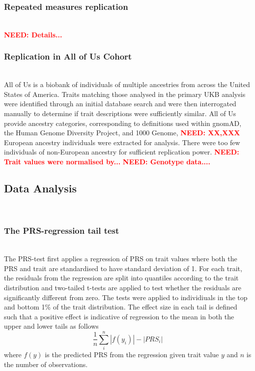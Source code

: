 \documentclass[times]{zHenriquesLab-StyleBioRxiv}
\newcommand\need[1]{\textbf{\textcolor{red}{NEED: #1}}}
\begin{document}
\subsubsection*{Repeated measures replication} ~\\
\need{Details...}

\subsubsection*{Replication in All of Us Cohort} ~\\
All of Us is a biobank of individuals of multiple ancestries from
across the United States of America. Traits matching those analysed in
the primary UKB analysis were identified through an initial database
search and were then interrogated manually to determine if trait
descriptions were sufficiently similar.  All of Us provide ancestry
categories, corresponding to definitions used within gnomAD, the Human
Genome Diversity Project, and 1000 Genome, \need {XX,XXX} European ancestry
individuals were extracted for analysis. There were too few
individuals of non-European ancestry for sufficient replication power.
\need{Trait values were normalised by...} \need{Genotype data....}


\subsection*{Data Analysis} ~\\
\vspace*{-0.5cm} 
\subsubsection*{The PRS-regression tail test}~\\
The PRS-test first applies a regression of PRS on trait values where
both the PRS and trait are standardised to have standard deviation of
1. For each trait, the residuals from the regression are split
into quantiles according to the trait distribution and two-tailed
t-tests are applied to test whether the residuals are significantly
different from zero.  The tests were applied to individiuals in the top
and bottom 1\% of the trait distribution. The effect size in each tail
is defined such that a positive effect is indicative of regression to
the mean in both the upper and lower tails as follows
\[
\frac{1}{n}\sum_i^n |{f(y_i)}| - |{PRS_i}|
\]
where $f(y)$ is the predicted PRS from the regression given trait
value $y$ and $n$ is the number of observations.
\end{document}

